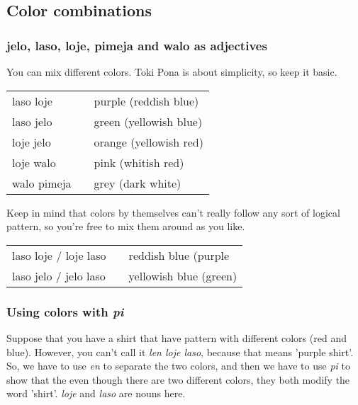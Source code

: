 \subsection*{Color combinations}
\subsubsection*{jelo, laso, loje, pimeja and walo as adjectives}

%
You can mix different colors. 
Toki Pona is about simplicity, so keep it basic. 

\begin{supertabular}{p{5,5cm}|ll}
laso loje && purple (reddish blue) \\
laso jelo && green (yellowish blue) \\
loje jelo && orange (yellowish red) \\
loje walo && pink (whitish red) \\
walo pimeja && grey (dark white) \\
\end{supertabular} 

Keep in mind that colors by themselves can't really follow any sort of logical pattern, so you're free to mix them around as you like. 

\begin{supertabular}{p{5,5cm}|ll}
laso loje / loje laso && reddish blue (purple \\
laso jelo / jelo laso && yellowish blue (green) \\
\end{supertabular} 
%
%
\subsubsection*{Using colors with \textit{pi}}
%
Suppose that you have a shirt that have pattern with different colors (red and blue). 
However, you can't call it \textit{len loje laso}, because that means 'purple shirt'. 
So, we have to use \textit{en} to separate the two colors, and then we have to use \textit{pi} to show that the even though there are two different colors, they both modify the word 'shirt'.
\textit{loje} and \textit{laso} are nouns here. 


